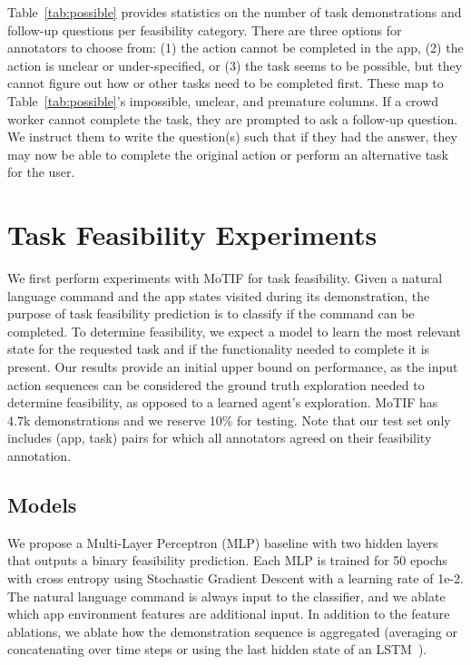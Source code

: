 Table~\ref{tab:possible} provides statistics on the number of task demonstrations and follow-up questions per feasibility category. There are three options for annotators to choose from: (1) the action cannot be completed in the app, (2) the action is unclear or under-specified, or (3) the task seems to be possible, but they cannot figure out how or other tasks need to be completed first. These map to Table~\ref{tab:possible}'s impossible, unclear, and premature columns. 
If a crowd worker cannot complete the task, they are prompted to ask a follow-up question. We instruct them to write the question(s) such that if they had the answer, they may now be able to complete the original action or perform an alternative task for the user. 

\section{Task Feasibility Experiments}
We first perform experiments with MoTIF for task feasibility. 
Given a natural language command and the app states visited during its demonstration, the purpose of task feasibility prediction is to classify if the command can be completed. To determine feasibility, we expect a model to learn the most relevant state for the requested task and if the functionality needed to complete it is present. 
Our results provide an initial upper bound on performance, as the input action sequences can be considered the ground truth exploration needed to determine feasibility, as opposed to a learned agent's exploration.  
MoTIF has 4.7k demonstrations and we reserve 10\% for testing. Note that our test set only includes (app, task) pairs for which all annotators agreed on their feasibility annotation.

\subsection{Models} We propose a Multi-Layer Perceptron (MLP) baseline with two hidden layers that outputs a binary feasibility prediction. Each MLP is trained for 50 epochs with cross entropy using Stochastic Gradient Descent with a learning rate of 1e-2. The natural language command is always input to the classifier, and we ablate which app environment features are additional input. In addition to the feature ablations, we ablate how the demonstration sequence is aggregated (averaging or concatenating over time steps or using the last hidden state of an LSTM~\cite{lstm}). 
\smallskip

